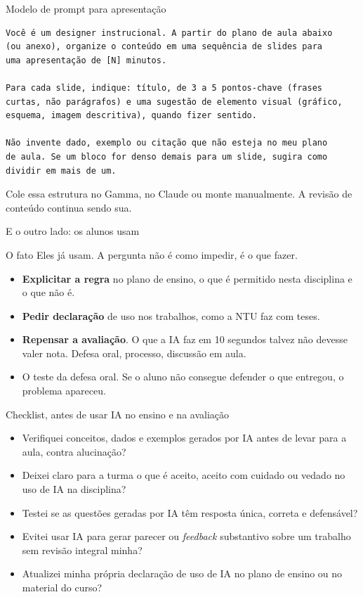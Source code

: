 \documentclass[11pt,aspectratio=169,t]{beamer}
\begin{document}
\begin{frame}[fragile]{Modelo de prompt para apresentação}
\begin{lstlisting}
Você é um designer instrucional. A partir do plano de aula abaixo
(ou anexo), organize o conteúdo em uma sequência de slides para
uma apresentação de [N] minutos.

Para cada slide, indique: título, de 3 a 5 pontos-chave (frases
curtas, não parágrafos) e uma sugestão de elemento visual (gráfico,
esquema, imagem descritiva), quando fizer sentido.

Não invente dado, exemplo ou citação que não esteja no meu plano
de aula. Se um bloco for denso demais para um slide, sugira como
dividir em mais de um.
\end{lstlisting}
\centering\small Cole essa estrutura no Gamma, no Claude ou monte manualmente. A revisão de conteúdo continua sendo sua.
\end{frame}

\begin{frame}{E o outro lado: os alunos usam}
  \begin{block}{O fato}
    Eles já usam. A pergunta não é como impedir, é o que fazer.
  \end{block}
  \pause
  \vfill
  \begin{itemize}
    \item \textbf{Explicitar a regra} no plano de ensino, o que é permitido nesta disciplina e o que não é.
    \pause
    \item \textbf{Pedir declaração} de uso nos trabalhos, como a NTU faz com teses.
    \pause
    \item \textbf{Repensar a avaliação}. O que a IA faz em 10 segundos talvez não devesse valer nota. Defesa oral, processo, discussão em aula.
    \pause
    \item \alert{O teste da defesa oral}. Se o aluno não consegue defender o que entregou, o problema apareceu.
  \end{itemize}
\end{frame}

\begin{frame}{Checklist, antes de usar IA no ensino e na avaliação}
  \small
  \begin{itemize}
    \item[$\square$] Verifiquei conceitos, dados e exemplos gerados por IA antes de levar para a aula, contra alucinação?
    \item[$\square$] Deixei claro para a turma o que é aceito, aceito com cuidado ou vedado no uso de IA na disciplina?
    \item[$\square$] Testei se as questões geradas por IA têm resposta única, correta e defensável?
    \item[$\square$] Evitei usar IA para gerar parecer ou \textit{feedback} substantivo sobre um trabalho sem revisão integral minha?
    \item[$\square$] Atualizei minha própria declaração de uso de IA no plano de ensino ou no material do curso?
  \end{itemize}
\end{frame}
\end{document}
